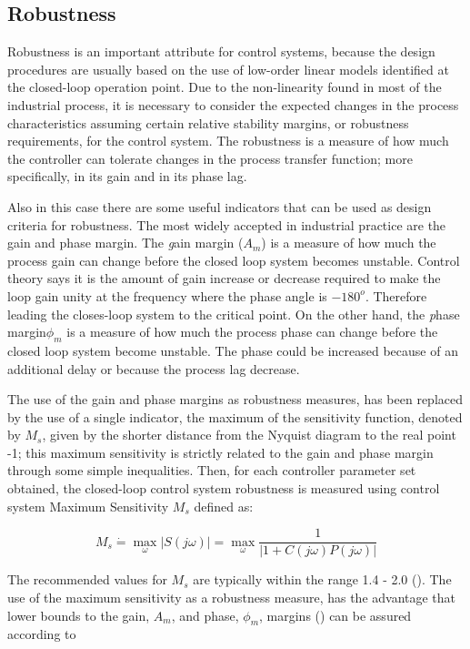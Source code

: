 \subsection{Robustness}

Robustness is an important attribute for control systems, because the design procedures are usually based on the use of low-order linear models identified at the closed-loop operation point. Due to the non-linearity found in most of the industrial process, it is necessary to consider the expected changes in the process characteristics assuming certain relative stability margins, or robustness requirements, for the control system. The robustness is a measure of how much the controller can tolerate changes in the process transfer function; more specifically, in its gain and in its phase lag.

Also in this case there are some useful indicators that can be used as design criteria for robustness. The most widely accepted in industrial practice are the gain and phase margin. The {\emph gain margin ($A_m$)} is a measure of how much the process gain can change before the closed loop system becomes unstable. Control theory says it is the amount of gain increase or decrease required to make the loop gain unity at the frequency where the phase angle is $-180^o$. Therefore leading the closes-loop system to the critical point. On the other hand, the {\emph phase margin$\phi_m$} is a measure of how much the process phase can change before the closed loop system become unstable. The phase could be increased because of an additional delay or because the process lag decrease.

The use of the gain and phase margins as robustness measures, has been replaced by the use of a single indicator, the maximum of the sensitivity function, denoted by $M_s$, given by the shorter distance from the Nyquist diagram to the real point -1; this maximum sensitivity is strictly related to the gain and phase margin through some simple inequalities. Then, for each controller parameter set obtained, the closed-loop control system robustness is measured using control system Maximum Sensitivity $M_s$ defined as:

\begin{equation}
M_{s} \dot{=} \max_{\omega} \left|S(j \omega)\right| = \max_{\omega} \frac{1}{\left|1+C(j \omega) P(j \omega)\right|}
\label{Eq:Ms}
\end{equation}

The recommended values for $M_s$ are typically within the range 1.4 - 2.0 (\cite{astromhagglund2006}). The use of  the maximum sensitivity as a robustness measure, has the advantage that lower bounds to the gain, $A_m$, and phase, $\phi_m$, margins (\cite{astromhagglund2006}) can be assured according to

